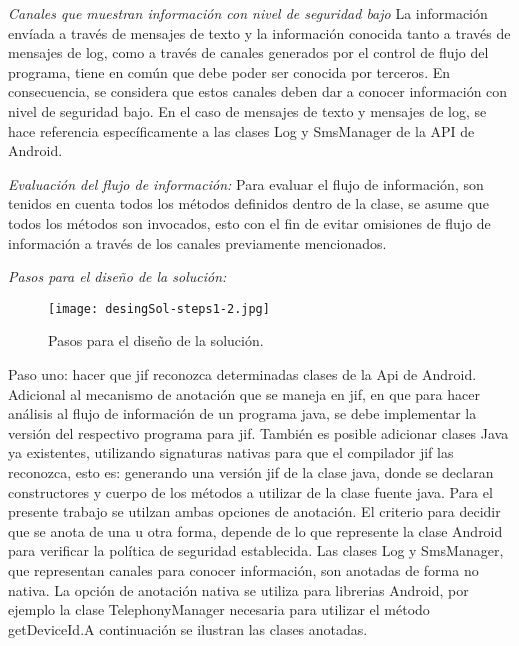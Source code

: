 \textit{Canales que muestran información con nivel de seguridad bajo}\newline
La información envíada a través de mensajes de texto y la información conocida
tanto a través de mensajes de log, como a través de canales generados por el
control de flujo del programa, tiene en común que debe poder ser conocida por
terceros. En consecuencia, se considera que estos canales deben dar a conocer
información con nivel de seguridad bajo.\newline
En el caso de mensajes de texto y mensajes de log, se hace referencia
específicamente a las clases Log y SmsManager de la API de Android.\newline

\textit{Evaluación del flujo de información:}\newline
Para evaluar el flujo de información, son tenidos en cuenta todos los métodos
definidos dentro de la clase, se asume que todos los métodos son invocados, esto
con el fin de evitar omisiones de flujo de información a través de los canales
previamente mencionados.

\textit{Pasos para el diseño de la solución:}\newline

\begin{figure}[h!]
	\begin{center}
	\texttt{[image: desingSol-steps1-2.jpg]}
	\end{center}
	\caption{Pasos para el diseño de la solución.}
	\label{fig:desingSol-steps1-2}
\end{figure}

Paso uno: hacer que jif reconozca determinadas clases de la Api de
Android.\newline 
Adicional al mecanismo de anotación que se maneja en jif, en que para hacer
análisis al flujo de información de un programa java, se debe implementar la
versión del respectivo programa para jif. También es posible adicionar clases
Java ya existentes, utilizando signaturas nativas para que el compilador jif las
reconozca, esto es: generando una versión jif de la clase java, donde se
declaran constructores y cuerpo de los métodos a utilizar de la clase fuente
java.\newline
Para el presente trabajo se utilzan ambas opciones de anotación. El criterio
para decidir que se anota de una u otra forma, depende de lo que represente la
clase Android para verificar la política de seguridad establecida. Las clases
Log y SmsManager, que representan canales para conocer información, son anotadas
de forma no nativa. La opción de anotación nativa se utiliza para librerias
Android, por ejemplo la clase TelephonyManager necesaria para utilizar el método
getDeviceId.\newline A continuación se ilustran las clases anotadas.

